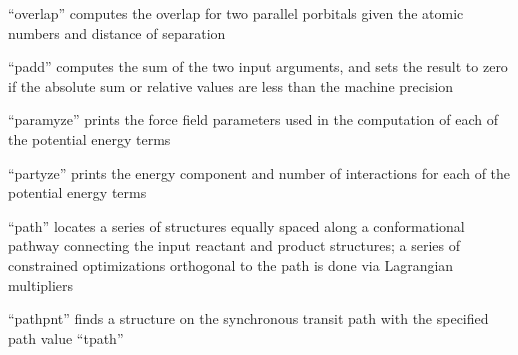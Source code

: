 \documentclass[letterpaper,11pt,english]{sphinxmanual}
\begin{document}
\sphinxAtStartPar
“overlap” computes the overlap for two parallel p\sphinxhyphen{}orbitals given the atomic numbers and distance of separation

\sphinxAtStartPar
{}

\sphinxAtStartPar
“padd” computes the sum of the two input arguments, and sets the result to zero if the absolute sum or relative values are less than the machine precision

\sphinxAtStartPar
{}

\sphinxAtStartPar
“paramyze” prints the force field parameters used in the computation of each of the potential energy terms

\sphinxAtStartPar
{}

\sphinxAtStartPar
“partyze” prints the energy component and number of interactions for each of the potential energy terms

\sphinxAtStartPar
{}

\sphinxAtStartPar
{}

\sphinxAtStartPar
{}

\sphinxAtStartPar
{}

\sphinxAtStartPar
{}

\sphinxAtStartPar
{}

\sphinxAtStartPar
{}

\sphinxAtStartPar
{}

\sphinxAtStartPar
{}

\sphinxAtStartPar
{}

\sphinxAtStartPar
{}

\sphinxAtStartPar
“path” locates a series of structures equally spaced along a conformational pathway connecting the input reactant and product structures; a series of constrained optimizations orthogonal to the path is done via Lagrangian multipliers

\sphinxAtStartPar
{}

\sphinxAtStartPar
{}

\sphinxAtStartPar
“pathpnt” finds a structure on the synchronous transit path with the specified path value “tpath”
\end{document}

